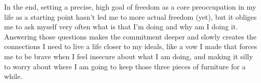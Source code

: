 In the end, setting a precise, high goal of freedom as a core
preoccupation in my life as a starting point hasn't led me to more
actual freedom (yet), but it obliges me to ask myself very often what is
that I'm doing and why am I doing it. Answering those questions makes
the commitment deeper and slowly creates the connections I need to live
a life closer to my ideals, like a vow I made that forces me to be brave
when I feel insecure about what I am doing, and making it silly to worry
about where I am going to keep those three pieces of furniture for a
while.
